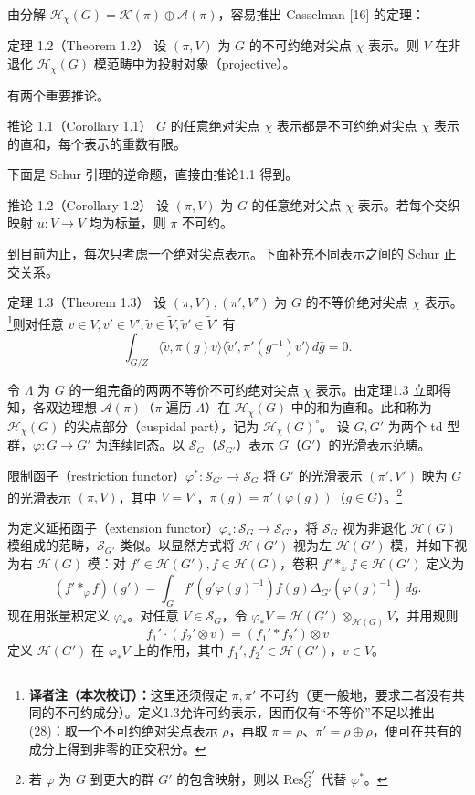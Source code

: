 由分解 $\mathcal H_\chi(G)=\mathcal K(\pi)\oplus\mathcal A(\pi)$，容易推出 Casselman [16] 的定理：
\begin{originaltheorem}{定理 1.2（Theorem 1.2）}
设 $(\pi,V)$ 为 $G$ 的不可约绝对尖点 $\chi$ 表示。则 $V$ 在非退化 $\mathcal H_\chi(G)$ 模范畴中为投射对象（projective）。
\end{originaltheorem}
有两个重要推论。
\begin{originaltheorem}{推论 1.1（Corollary 1.1）}
$G$ 的任意绝对尖点 $\chi$ 表示都是不可约绝对尖点 $\chi$ 表示的直和，每个表示的重数有限。
\end{originaltheorem}
下面是 Schur 引理的逆命题，直接由推论1.1 得到。
\begin{originaltheorem}{推论 1.2（Corollary 1.2）}
设 $(\pi,V)$ 为 $G$ 的任意绝对尖点 $\chi$ 表示。若每个交织映射 $u:V\to V$ 均为标量，则 $\pi$ 不可约。
\end{originaltheorem}
到目前为止，每次只考虑一个绝对尖点表示。下面补充不同表示之间的 Schur 正交关系。
\begin{originaltheorem}{定理 1.3（Theorem 1.3）}
设 $(\pi,V),(\pi',V')$ 为 $G$ 的不等价绝对尖点 $\chi$ 表示。\footnote{\textbf{译者注（本次校订）：}这里还须假定 $\pi,\pi'$ 不可约（更一般地，要求二者没有共同的不可约成分）。定义1.3允许可约表示，因而仅有“不等价”不足以推出 (28)：取一个不可约绝对尖点表示 $\rho$，再取 $\pi=\rho$、$\pi'=\rho\oplus\rho$，便可在共有的成分上得到非零的正交积分。}则对任意 $v\in V,v'\in V',\widetilde v\in\widetilde V,\widetilde v'\in\widetilde V'$ 有
\[
\int_{G/Z}\langle\widetilde v,\pi(g)v\rangle\langle\widetilde v',\pi'(g^{-1})v'\rangle\,d\bar g=0.\tag{28}
\]
\end{originaltheorem}
令 $\Lambda$ 为 $G$ 的一组完备的两两不等价不可约绝对尖点 $\chi$ 表示。由定理1.3 立即得知，各双边理想 $\mathcal A(\pi)$（$\pi$ 遍历 $\Lambda$）在 $\mathcal H_\chi(G)$ 中的和为直和。此和称为 $\mathcal H_\chi(G)$ 的尖点部分（cuspidal part），记为 $\mathcal H_\chi(G)^\circ$。
设 $G,G'$ 为两个 td 型群，$\varphi:G\to G'$ 为连续同态。以 $\mathcal S_G$（$\mathcal S_{G'}$）表示 $G$（$G'$）的光滑表示范畴。

限制函子（restriction functor）$\varphi^*:\mathcal S_{G'}\to\mathcal S_G$ 将 $G'$ 的光滑表示 $(\pi',V')$ 映为 $G$ 的光滑表示 $(\pi,V)$，其中 $V=V'$，$\pi(g)=\pi'(\varphi(g))$（$g\in G$）。\footnote{若 $\varphi$ 为 $G$ 到更大的群 $G'$ 的包含映射，则以 $\operatorname{Res}_G^{G'}$ 代替 $\varphi^*$。}

为定义延拓函子（extension functor）$\varphi_*:\mathcal S_G\to\mathcal S_{G'}$，将 $\mathcal S_G$ 视为非退化 $\mathcal H(G)$ 模组成的范畴，$\mathcal S_{G'}$ 类似。以显然方式将 $\mathcal H(G')$ 视为左 $\mathcal H(G')$ 模，并如下视为右 $\mathcal H(G)$ 模：对 $f'\in\mathcal H(G'),f\in\mathcal H(G)$，卷积 $f'*_\varphi f\in\mathcal H(G')$ 定义为
\[
(f'*_\varphi f)(g')=\int_G f'(g'\varphi(g)^{-1})f(g)\Delta_{G'}(\varphi(g)^{-1})\,dg.\tag{29}
\]
现在用张量积定义 $\varphi_*$。对任意 $V\in\mathcal S_G$，令 $\varphi_*V=\mathcal H(G')\otimes_{\mathcal H(G)}V$，并用规则
\[
f_1'\cdot(f_2'\otimes v)=(f_1'*f_2')\otimes v\tag{30}
\]
定义 $\mathcal H(G')$ 在 $\varphi_*V$ 上的作用，其中 $f_1',f_2'\in\mathcal H(G')$，$v\in V$。

